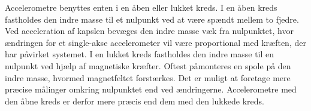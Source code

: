 Accelerometre benyttes enten i en åben eller lukket kreds. I en åben kreds fastholdes den indre masse til et nulpunkt ved at være spændt mellem to fjedre. Ved acceleration af kapslen bevæges den indre masse væk fra nulpunktet, hvor ændringen for et single-akse accelerometer vil være proportional med kræften, der har påvirket systemet. I en lukket kreds fastholdes den indre masse til en nulpunkt ved hjælp af magnetiske kræfter. Oftest påmonteres en spole på den indre masse, hvormed magnetfeltet forstærkes. Det er muligt at foretage mere præcise målinger omkring nulpunktet end ved ændringerne. Accelerometre med den åbne kreds er derfor mere præcis end dem med den lukkede kreds. 

%
